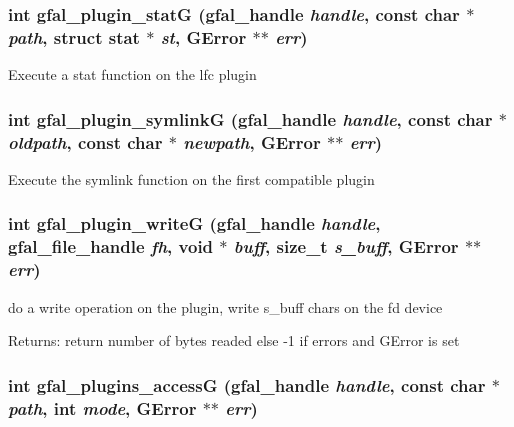 \subsubsection{\setlength{\rightskip}{0pt plus 5cm}int gfal\_\-plugin\_\-stat\-G (gfal\_\-handle {\em handle}, const char $\ast$ {\em path}, struct stat $\ast$ {\em st}, GError $\ast$$\ast$ {\em err})}\label{gfal__common__plugin_8c_98b9e43ecd18ce2fc728d4a731e52ce1}


Execute a stat function on the lfc plugin 
\subsubsection{\setlength{\rightskip}{0pt plus 5cm}int gfal\_\-plugin\_\-symlink\-G (gfal\_\-handle {\em handle}, const char $\ast$ {\em oldpath}, const char $\ast$ {\em newpath}, GError $\ast$$\ast$ {\em err})}\label{gfal__common__plugin_8c_6ff9d39b564be7d0a560a09288e19b9e}


Execute the symlink function on the first compatible plugin 
\subsubsection{\setlength{\rightskip}{0pt plus 5cm}int gfal\_\-plugin\_\-write\-G (gfal\_\-handle {\em handle}, gfal\_\-file\_\-handle {\em fh}, void $\ast$ {\em buff}, size\_\-t {\em s\_\-buff}, GError $\ast$$\ast$ {\em err})}\label{gfal__common__plugin_8c_caaf6298a84f453bb6ddd50c36b6dfd7}


do a write operation on the plugin, write s\_\-buff chars on the fd device \begin{Desc}
\item[Returns:]return number of bytes readed else -1 if errors and GError is set \end{Desc}
\subsubsection{\setlength{\rightskip}{0pt plus 5cm}int gfal\_\-plugins\_\-access\-G (gfal\_\-handle {\em handle}, const char $\ast$ {\em path}, int {\em mode}, GError $\ast$$\ast$ {\em err})}\label{gfal__common__plugin_8c_b59f407ec7865163a60faaa56cbae432}


